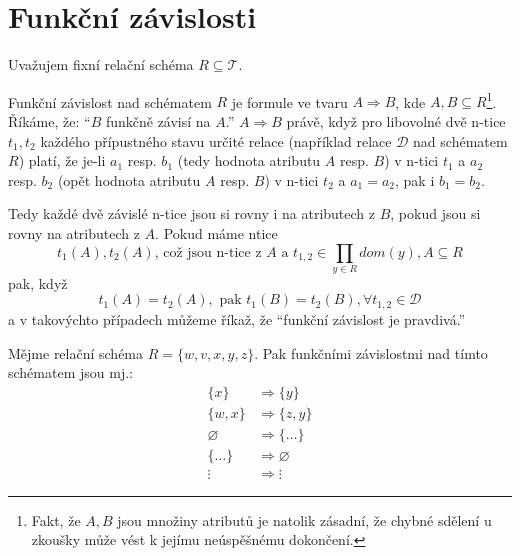 \section{Funkční závislosti}
Uvažujem fixní relační schéma $R \subseteq \mathcal{T}$.
\begin{uptheorem}
Funkční závislost nad schématem $R$ je formule ve tvaru $A \Rightarrow B$, kde $A, B \subseteq R$\footnote{Fakt, že $A, B$ jsou množiny atributů je natolik zásadní, že chybné sdělení u zkoušky může vést k jejímu neúspěšnému dokončení.}. Říkáme, že: \enquote{$B$ funkčně závisí na $A$.} $A \Rightarrow B$ právě, když pro libovolné dvě n-tice $t_{1}, t_{2}$ každého přípustného stavu určité relace (například relace $\mathcal{D}$ nad schématem $R$) platí, že je-li $a_{1}$ resp. $b_{1}$ (tedy  hodnota atributu $A$ resp. $B$) v n-tici $t_{1}$ a $a_{2}$ resp. $b_{2}$ (opět hodnota atributu $A$ resp. $B$) v n-tici $t_{2}$ a $a_{1} = a_{2}$, pak i $b_{1} = b_{2}$.

Tedy každé dvě závislé n-tice jsou si rovny i na atributech z $B$, pokud jsou si rovny na atributech z $A$. Pokud máme ntice
$$
t_{1}(A), t_{2}(A) \text{, což jsou n-tice z } A \text{ a } t_{1, 2} \in \prod_{y \in R} dom(y), A \subseteq R
$$
pak, když
$$
t_{1}(A) = t_{2}(A), \text{ pak } t_{1}(B) = t_{2}(B), \forall t_{1,2} \in \mathcal{D}
$$
a v takovýchto případech můžeme říkaž, že \enquote{funkční závislost je pravdivá.}
\end{uptheorem}

\begin{upexample}
Mějme relační schéma $R = \{ w, v, x, y, z \}$. Pak funkčními závislostmi nad tímto schématem jsou mj.:
\begin{align*}
\{ x \} &\Rightarrow \{ y \} \\
\{ w, x \} &\Rightarrow \{ z, y \} \\
\varnothing &\Rightarrow \{ \ldots \} \\
\{ \ldots \} &\Rightarrow \varnothing \\
\vdots &\Rightarrow \vdots
\end{align*}
\end{upexample}

